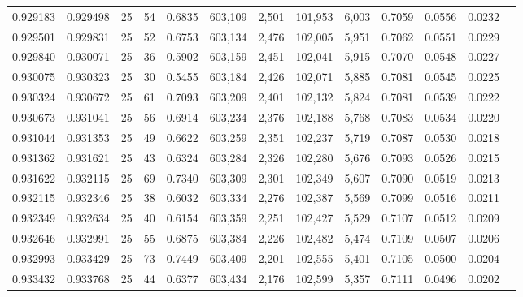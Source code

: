 \begin{tabular}{rrrrrrrrrrrrr}
0.929183 & 0.929498 &    25 &  54 &                                     0.6835 & 603,109 &   2,501 & 101,953 &   6,003 & 0.7059 & 0.0556 & 0.0232 \\
0.929501 & 0.929831 &    25 &  52 &                                     0.6753 & 603,134 &   2,476 & 102,005 &   5,951 & 0.7062 & 0.0551 & 0.0229 \\
0.929840 & 0.930071 &    25 &  36 &                                     0.5902 & 603,159 &   2,451 & 102,041 &   5,915 & 0.7070 & 0.0548 & 0.0227 \\
0.930075 & 0.930323 &    25 &  30 &                                     0.5455 & 603,184 &   2,426 & 102,071 &   5,885 & 0.7081 & 0.0545 & 0.0225 \\
0.930324 & 0.930672 &    25 &  61 &                                     0.7093 & 603,209 &   2,401 & 102,132 &   5,824 & 0.7081 & 0.0539 & 0.0222 \\
0.930673 & 0.931041 &    25 &  56 &                                     0.6914 & 603,234 &   2,376 & 102,188 &   5,768 & 0.7083 & 0.0534 & 0.0220 \\
0.931044 & 0.931353 &    25 &  49 &                                     0.6622 & 603,259 &   2,351 & 102,237 &   5,719 & 0.7087 & 0.0530 & 0.0218 \\
0.931362 & 0.931621 &    25 &  43 &                                     0.6324 & 603,284 &   2,326 & 102,280 &   5,676 & 0.7093 & 0.0526 & 0.0215 \\
0.931622 & 0.932115 &    25 &  69 &                                     0.7340 & 603,309 &   2,301 & 102,349 &   5,607 & 0.7090 & 0.0519 & 0.0213 \\
0.932115 & 0.932346 &    25 &  38 &                                     0.6032 & 603,334 &   2,276 & 102,387 &   5,569 & 0.7099 & 0.0516 & 0.0211 \\
0.932349 & 0.932634 &    25 &  40 &                                     0.6154 & 603,359 &   2,251 & 102,427 &   5,529 & 0.7107 & 0.0512 & 0.0209 \\
0.932646 & 0.932991 &    25 &  55 &                                     0.6875 & 603,384 &   2,226 & 102,482 &   5,474 & 0.7109 & 0.0507 & 0.0206 \\
0.932993 & 0.933429 &    25 &  73 &                                     0.7449 & 603,409 &   2,201 & 102,555 &   5,401 & 0.7105 & 0.0500 & 0.0204 \\
0.933432 & 0.933768 &    25 &  44 &                                     0.6377 & 603,434 &   2,176 & 102,599 &   5,357 & 0.7111 & 0.0496 & 0.0202 \\

\end{tabular}
